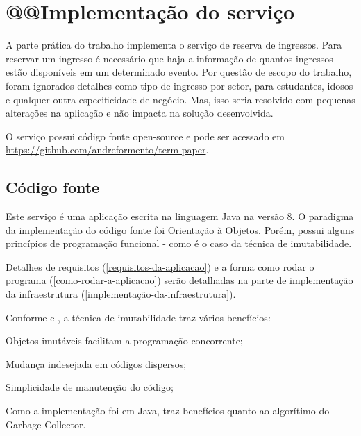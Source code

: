 \chapter{@@Implementação do serviço}


A parte prática do trabalho implementa o serviço de reserva de ingressos.
Para reservar um ingresso é necessário que haja a informação de quantos ingressos
estão disponíveis em um determinado evento. Por questão de escopo do trabalho,
foram ignorados detalhes como
tipo de ingresso por setor, para estudantes, idosos e qualquer outra especificidade
de negócio. Mas, isso seria resolvido com pequenas alterações na aplicação
e não impacta na solução desenvolvida.

O serviço possui código fonte open-source e pode ser acessado em
\url{https://github.com/andreformento/term-paper}.

\section{Código fonte}

Este serviço é uma aplicação escrita na linguagem Java na versão 8. O paradigma
da implementação do código fonte foi Orientação à Objetos. Porém, possui alguns
princípios de programação funcional - como é o caso da técnica de imutabilidade.

Detalhes de requisitos (\autoref{requisitos-da-aplicacao}) e a
forma como rodar o programa (\autoref{como-rodar-a-aplicacao}) serão detalhadas
na parte de implementação da infraestrutura (\autoref{implementação-da-infraestrutura}).

Conforme
\cite{does-immutability-really-mean-thread-safety} e \cite{java-doc-immutable-objects},
a técnica de imutabilidade traz vários benefícios:

\begin{alineas}

  \item Objetos imutáveis facilitam a programação concorrente;

  \item Mudança indesejada em códigos dispersos;

  \item Simplicidade de manutenção do código;

  \item Como a implementação foi em Java, traz benefícios quanto ao algorítimo do
        Garbage Collector.

\end{alineas}


